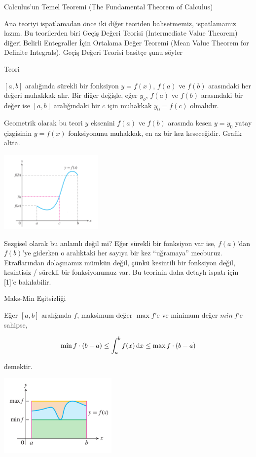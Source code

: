 \documentclass[12pt,fleqn]{article}\usepackage{../../common}
\begin{document}
Calculus'un Temel Teoremi (The Fundamental Theorem of Calculus)

Ana teoriyi ispatlamadan önce iki diğer teoriden bahsetmemiz, ispatlamamız
lazım. Bu teorilerden biri Geçiş Değeri Teorisi (Intermediate Value
Theorem) diğeri Belirli Entegraller İçin Ortalama Değer Teoremi (Mean Value
Theorem for Definite Integrals). Geçiş Değeri Teorisi basitçe şunu söyler

Teori

$[a,b]$ aralığında sürekli bir fonksiyon $y=f(x)$, $f(a)$ ve $f(b)$
arasındaki her değeri muhakkak alır. Bir diğer değişle, eğer $y_o$, $f(a)$
ve $f(b)$ arasındaki bir değer ise $[a,b]$ aralığındaki bir $c$ için
muhakkak $y_0 = f(c)$ olmalıdır. 

Geometrik olarak bu teori $y$ eksenini $f(a)$ ve $f(b)$ arasında kesen
$y=y_0$ yatay çizgisinin $y=f(x)$ fonksiyonunu muhakkak, en az bir kez
keseceğidir. Grafik altta. 

\includegraphics[height=4cm]{calc_multi_app_05.png}

Sezgisel olarak bu anlamlı değil mi? Eğer sürekli bir fonksiyon var ise,
$f(a)$'dan $f(b)$'ye giderken o aralıktaki her sayıya bir kez ``uğramaya''
mecburuz. Etraflarından dolaşmamız mümkün değil, çünkü kesintili bir
fonksiyon değil, kesintisiz / sürekli bir fonksiyonumuz var. Bu teorinin
daha detaylı ispatı için [1]'e bakılabilir. 

Maks-Min Eşitsizliği

Eğer $[a,b]$ aralığında $f$, maksimum değer $\max f$'e ve minimum değer
$min \ f$'e sahipse, 

$$ \min f \cdot (b-a) \le \int_a^b f(x) \,\mathrm{d} x \le \max f \cdot (b-a) $$

demektir. 

\includegraphics[height=4cm]{calc_multi_app_08.png}
\end{document}
